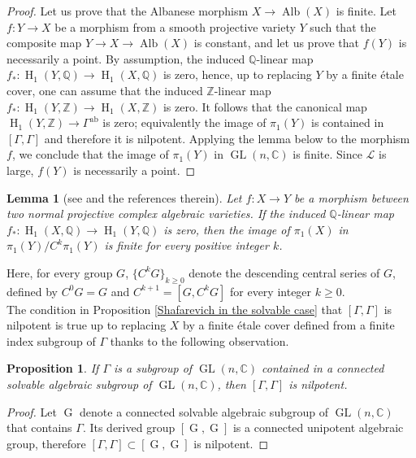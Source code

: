 \documentclass[11pt,letterpaper]{amsart}
\def\bZ{\mathbb{Z}}
\def\bQ{\mathbb{Q}}
\def\bC{\mathbb{C}}
\def\bZ{\mathbb{Z}}
\def\cL{\mathcal{L}}
\theoremstyle{plain}
\newtheorem{lem}[thm]{Lemma}
\newtheorem{prop}[thm]{Proposition}
\DeclareMathOperator{\rG}{G}
\DeclareMathOperator{\GL}{GL}
\DeclareMathOperator{\Alb}{Alb}
\DeclareMathOperator{\HH}{H}
\begin{document}
\begin{proof}
Let us prove that the Albanese morphism $X \to \Alb(X)$ is finite. Let $f \colon Y \to X$ be a morphism from a smooth projective variety $Y$ such that the composite map $Y \to X \to \Alb(X)$ is constant, and let us prove that $f(Y)$ is necessarily a point. By assumption, the induced $\bQ$-linear map $f_\ast \colon \HH_1(Y, \bQ) \to \HH_1(X, \bQ)$ is zero, hence, up to replacing $Y$ by a finite étale cover, one can assume that the induced $\bZ$-linear map $f_\ast \colon \HH_1(Y, \bZ) \to \HH_1(X, \bZ)$ is zero. It follows that the canonical map $\HH_1(Y, \bZ) \to \Gamma^{\mathrm{ab}}$ is zero; equivalently the image of $\pi_1(Y)$ is contained in $[\Gamma, \Gamma]$ and therefore it is nilpotent. Applying the lemma below to the morphism $f$, we conclude that the image of $\pi_1(Y)$ in $\GL(n , \bC)$ is finite. Since $\cL$ is large, $f(Y)$ is necessarily a point.
\end{proof}


\begin{lem}[{see \cite[Lemme 4.6]{CCE} and the references therein}]\label{central serie}
Let $f \colon X \to Y$ be a morphism between two normal projective complex algebraic varieties. If the induced $\bQ$-linear map $f_\ast \colon \HH_1(X, \bQ) \to \HH_1(Y, \bQ)$ is zero, then the image of $\pi_1(X)$ in $\pi_1(Y) \slash C^k \pi_1(Y)$ is finite for every positive integer $k$. 
\end{lem}
Here, for every group $G$, $\{C^kG \}_{k \geq 0}$ denote the descending central series of $G$, defined by $C^0G = G$ and $C^{k+1} = [G, C^k G]$ for every integer $k \geq 0$. \\

The condition in Proposition \ref{Shafarevich in the solvable case} that $[\Gamma , \Gamma]$ is nilpotent is true up to replacing $X$ by a finite étale cover defined from a finite index subgroup of $\Gamma$ thanks to the following observation.

\begin{prop}\label{criterion derived group nilpotent}
If $\Gamma$ is a subgroup of $ \GL(n , \bC)$ contained in a connected solvable algebraic subgroup of $ \GL(n , \bC)$, then
$[\Gamma, \Gamma]$ is nilpotent.
\end{prop}
\begin{proof}
Let $\rG$ denote a connected solvable algebraic subgroup of $ \GL(n , \bC)$ that contains $\Gamma$. Its derived group $[\rG , \rG ]$ is a connected unipotent algebraic group, therefore $[\Gamma, \Gamma] \subset [\rG, \rG]$ is nilpotent.
\end{proof}
\end{document}
